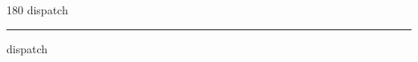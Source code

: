 
\begin{frame}
\begin{center}
\begin{turn}{180}
{\fontsize{2.5cm}{1em}\selectfont dispatch}
\end{turn}
\vspace{1em}\par  
\hrule
\vspace{1em}\par  
{\fontsize{2.5cm}{1em}\selectfont dispatch}
\end{center}
\end{frame}
